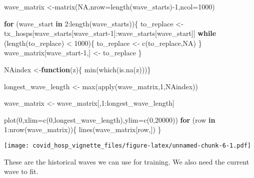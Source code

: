 \documentclass[
]{article}
\newenvironment{Shaded}{\begin{snugshade}}{\end{snugshade}}
\newcommand{\AttributeTok}[1]{\textcolor[rgb]{0.77,0.63,0.00}{#1}}
\newcommand{\ConstantTok}[1]{\textcolor[rgb]{0.00,0.00,0.00}{#1}}
\newcommand{\ControlFlowTok}[1]{\textcolor[rgb]{0.13,0.29,0.53}{\textbf{#1}}}
\newcommand{\DecValTok}[1]{\textcolor[rgb]{0.00,0.00,0.81}{#1}}
\newcommand{\FunctionTok}[1]{\textcolor[rgb]{0.00,0.00,0.00}{#1}}
\newcommand{\NormalTok}[1]{#1}
\newcommand{\OtherTok}[1]{\textcolor[rgb]{0.56,0.35,0.01}{#1}}
\newcommand{\SpecialCharTok}[1]{\textcolor[rgb]{0.00,0.00,0.00}{#1}}
\begin{document}
\begin{Shaded}
\begin{Highlighting}[]
\NormalTok{wave\_matrix }\OtherTok{\textless{}{-}}\FunctionTok{matrix}\NormalTok{(}\ConstantTok{NA}\NormalTok{,}\AttributeTok{nrow=}\FunctionTok{length}\NormalTok{(wave\_starts)}\SpecialCharTok{{-}}\DecValTok{1}\NormalTok{,}\AttributeTok{ncol=}\DecValTok{1000}\NormalTok{)}

\ControlFlowTok{for}\NormalTok{ (wave\_start }\ControlFlowTok{in} \DecValTok{2}\SpecialCharTok{:}\FunctionTok{length}\NormalTok{(wave\_starts))\{}
\NormalTok{  to\_replace }\OtherTok{\textless{}{-}}\NormalTok{ tx\_hosps[wave\_starts[wave\_start}\DecValTok{{-}1}\NormalTok{]}\SpecialCharTok{:}\NormalTok{wave\_starts[wave\_start]]}
  \ControlFlowTok{while}\NormalTok{ (}\FunctionTok{length}\NormalTok{(to\_replace) }\SpecialCharTok{\textless{}} \DecValTok{1000}\NormalTok{)\{}
\NormalTok{    to\_replace }\OtherTok{\textless{}{-}} \FunctionTok{c}\NormalTok{(to\_replace,}\ConstantTok{NA}\NormalTok{)}
\NormalTok{  \}}
\NormalTok{  wave\_matrix[wave\_start}\DecValTok{{-}1}\NormalTok{,] }\OtherTok{\textless{}{-}}\NormalTok{ to\_replace}
\NormalTok{\}}


\NormalTok{NAindex }\OtherTok{\textless{}{-}}\ControlFlowTok{function}\NormalTok{(z)\{ }\FunctionTok{min}\NormalTok{(}\FunctionTok{which}\NormalTok{(}\FunctionTok{is.na}\NormalTok{(z)))\}}

\NormalTok{longest\_wave\_length }\OtherTok{\textless{}{-}} \FunctionTok{max}\NormalTok{(}\FunctionTok{apply}\NormalTok{(wave\_matrix,}\DecValTok{1}\NormalTok{,NAindex))}

\NormalTok{wave\_matrix }\OtherTok{\textless{}{-}}\NormalTok{ wave\_matrix[,}\DecValTok{1}\SpecialCharTok{:}\NormalTok{longest\_wave\_length]}

\FunctionTok{plot}\NormalTok{(}\DecValTok{0}\NormalTok{,}\AttributeTok{xlim=}\FunctionTok{c}\NormalTok{(}\DecValTok{0}\NormalTok{,longest\_wave\_length),}\AttributeTok{ylim=}\FunctionTok{c}\NormalTok{(}\DecValTok{0}\NormalTok{,}\DecValTok{20000}\NormalTok{))}
\ControlFlowTok{for}\NormalTok{ (row }\ControlFlowTok{in} \DecValTok{1}\SpecialCharTok{:}\FunctionTok{nrow}\NormalTok{(wave\_matrix))\{}
  \FunctionTok{lines}\NormalTok{(wave\_matrix[row,])}
\NormalTok{\}}
\end{Highlighting}
\end{Shaded}

\texttt{[image: covid\_hosp\_vignette\_files/figure-latex/unnamed-chunk-6-1.pdf]}

These are the historical waves we can use for training. We also need the
current wave to fit.
\end{document}

